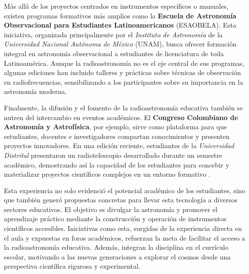 Más allá de los proyectos centrados en instrumentos específicos o manuales,
existen programas formativos más amplios como la \textbf{Escuela de Astronomía
Observacional para Estudiantes Latinoamericanos} (ESAOBELA).
Esta iniciativa, organizada principalmente por el \emph{Instituto de
Astronomía} de la \emph{Universidad Nacional Autónoma de México} (UNAM), busca
ofrecer formación integral en astronomía observacional a estudiantes de
licenciatura de toda Latinoamérica.
Aunque la radioastronomía no es el eje central de sus programas, algunas
ediciones han incluido talleres y prácticas sobre técnicas de observación en
radiofrecuencias, sensibilizando a los participantes sobre su importancia en la
astronomía moderna.

Finalmente, la difusión y el fomento de la radioastronomía educativa también se
nutren del intercambio en eventos académicos.
El \textbf{Congreso Colombiano de Astronomía y Astrofísica}, por ejemplo, sirve
como plataforma para que estudiantes, docentes e investigadores compartan
conocimientos y presenten proyectos innovadores.
En una edición reciente, estudiantes de la \emph{Universidad Distrital}
presentaron un radiotelescopio desarrollado durante un semestre académico,
demostrando así la capacidad de los estudiantes para concebir y materializar
proyectos científicos complejos en un entorno formativo \cite{Anzola2024}.

Esta experiencia no solo evidenció el potencial académico de los estudiantes,
sino que también generó propuestas concretas para llevar esta tecnología a
diversos sectores educativos.
El objetivo es divulgar la astronomía y promover el aprendizaje práctico
mediante la construcción y operación de instrumentos científicos accesibles.
Iniciativas como esta, surgidas de la experiencia directa en el aula
y expuestas en foros académicos, refuerzan la meta de facilitar el acceso a la
radioastronomía educativa.
Además, integran la disciplina en el currículo escolar, motivando a las nuevas
generaciones a explorar el cosmos desde una perspectiva científica rigurosa
y experimental.
